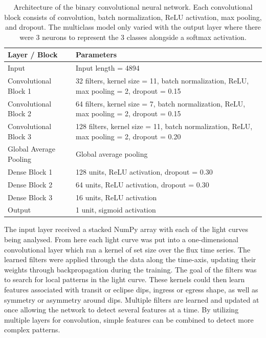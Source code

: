 \begin{table}[h]
    \centering
    \small
    \begin{tabularx}{\textwidth}{l X}
        \toprule
        \textbf{Layer / Block} & \textbf{Parameters} \\
        \midrule
        Input &
        Input length = 4894 \\

        Convolutional Block 1 &
        32 filters, kernel size = 11, batch normalization,
        ReLU, max pooling = 2, dropout = 0.15 \\

        Convolutional Block 2 &
        64 filters, kernel size = 7, batch normalization,
        ReLU, max pooling = 2, dropout = 0.15 \\

        Convolutional Block 3 &
        128 filters, kernel size = 11, batch normalization,
        ReLU, max pooling = 2, dropout = 0.20 \\

        Global Average Pooling &
        Global average pooling \\

        Dense Block 1 &
        128 units, ReLU activation, dropout = 0.30 \\

        Dense Block 2 &
        64 units, ReLU activation, dropout = 0.30 \\

        Dense Block 3 &
        16 units, ReLU activation \\

        Output &
        1 unit, sigmoid activation \\
        \bottomrule
    \end{tabularx}

    \caption{Architecture of the binary convolutional neural network. Each
    convolutional block consists of convolution, batch normalization, ReLU
    activation, max pooling, and dropout. The multiclass model only varied with the output layer where there were 3 neurons to represent the 3 classes alongside a softmax activation.}
    \label{tab:layer_order}
\end{table}

The input layer received a stacked NumPy array with each of the light curves being analysed. From here each light curve was put into a one-dimensional convolutional layer which ran a kernel of set size over the flux time series. The learned filters were applied through the data along the time-axis, updating their weights through backpropagation during the training. The goal of the filters was to search for local patterns in the light curve. These kernels could then learn features associated with transit or eclipse dips, ingress or egress shape, as well as symmetry or asymmetry around dips. Multiple filters are learned and updated at once allowing the network to detect several features at a time. By utilizing multiple layers for convolution, simple features can be combined to detect more complex patterns.

